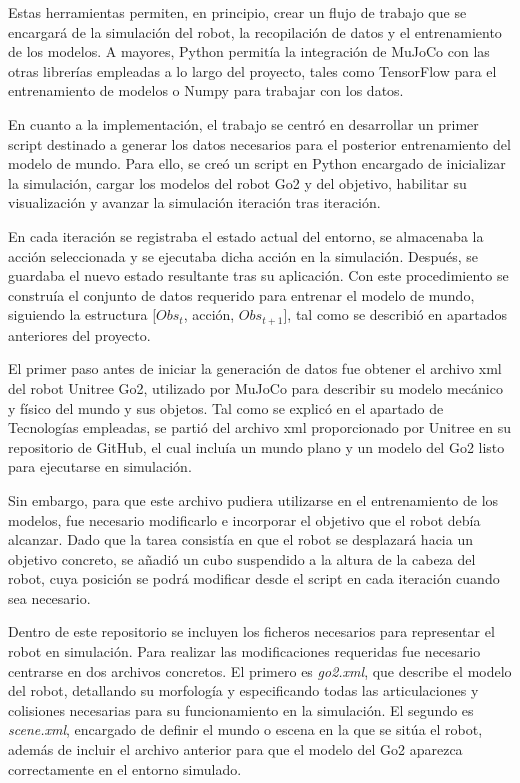 Estas herramientas permiten, en principio, crear un flujo de trabajo que se encargará de la simulación del robot, la recopilación de datos y el entrenamiento de los 
modelos. A mayores, Python permitía la integración de MuJoCo con las otras librerías empleadas a lo largo del proyecto, tales como TensorFlow para el entrenamiento de modelos 
o Numpy para trabajar con los datos.

En cuanto a la implementación, el trabajo se centró en desarrollar un primer \gls{script} destinado a generar los datos necesarios para el posterior entrenamiento del modelo de mundo. 
Para ello, se creó un \gls{script} en Python encargado de inicializar la simulación, cargar los modelos del robot Go2 y del objetivo, habilitar su visualización y avanzar la simulación 
iteración tras iteración.

En cada iteración se registraba el estado actual del entorno, se almacenaba la acción seleccionada y se ejecutaba dicha acción en la simulación. Después, se guardaba el nuevo estado 
resultante tras su aplicación. Con este procedimiento se construía el conjunto de datos requerido para entrenar el modelo de mundo, siguiendo la estructura [\( Obs_t \), acción, \( Obs_{t+1} \)], tal 
como se describió en apartados anteriores del proyecto.

El primer paso antes de iniciar la generación de datos fue obtener el archivo \Gls{xml} del robot Unitree Go2, utilizado por MuJoCo para describir su modelo mecánico y físico del mundo y sus 
objetos. Tal como se explicó en el apartado de Tecnologías empleadas, se partió del archivo \Gls{xml} proporcionado por Unitree en su repositorio de GitHub, el cual incluía un mundo plano 
y un modelo del Go2 listo para ejecutarse en simulación.

Sin embargo, para que este archivo pudiera utilizarse en el entrenamiento de los modelos, fue necesario modificarlo e incorporar el objetivo que el robot debía alcanzar. Dado que la tarea 
consistía en que el robot se desplazará hacia un objetivo concreto, se añadió un cubo suspendido a la altura de la cabeza del robot, cuya posición se podrá modificar desde el 
\gls{script} en cada iteración cuando sea necesario.

Dentro de este repositorio se incluyen los ficheros necesarios para representar el robot en simulación. Para realizar las modificaciones requeridas fue necesario centrarse en dos 
archivos concretos. El primero es \textit{go2.xml}, que describe el modelo del robot, detallando su morfología y especificando todas las articulaciones y colisiones necesarias para su 
funcionamiento en la simulación. El segundo es \textit{scene.xml}, encargado de definir el mundo o escena en la que se sitúa el robot, además de incluir el archivo anterior para que el 
modelo del Go2 aparezca correctamente en el entorno simulado.

